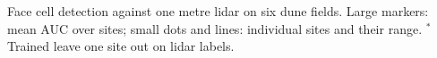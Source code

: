 Face cell detection against one metre lidar on six dune fields. Large markers: mean AUC over sites; small dots and lines: individual sites and their range. $^{*}$Trained leave one site out on lidar labels.
